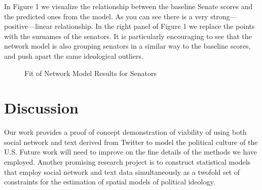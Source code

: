 \documentclass[10pt]{article}
\begin{document}
In Figure 1 we visualize the relationship between the baseline Senate scores and the predicted ones from the model.  As you can see there is a very strong---positive---linear relationship. In the right panel of Figure 1 we replace the points with the surnames of the senators.  It is particularly encouraging to see that the network model is also grouping senators in a similar way to the baseline scores, and push apart the same ideological outliers.

\begin{figure}[!ht]
    \centering
    \caption{Fit of Network Model Results for Senators}
    \label{fig:senators}
\end{figure}

\section{Discussion}
Our work provides a proof of concept demonstration of viability of using both social network and text derived from Twitter to model the political culture of the U.S. Future work will need to improve on the fine details of the methods we have employed. Another promising research project is to construct statistical models that employ social network and text data simultaneously as a twofold set of constraints for the estimation of spatial models of political ideology.
\end{document}

